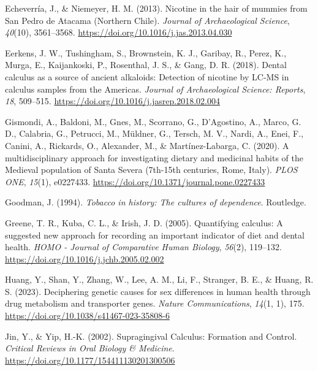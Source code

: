 \documentclass[
  11pt,
  leqno]{scrartcl}
\newlength{\cslhangindent}
\newenvironment{CSLReferences}[2] %
 {\begin{list}{}{%
  \setlength{\itemindent}{0pt}
  \setlength{\leftmargin}{0pt}
  \setlength{\parsep}{0pt}
  \ifodd #1
   \setlength{\leftmargin}{\cslhangindent}
   \setlength{\itemindent}{-1\cslhangindent}
  \fi
  \setlength{\itemsep}{#2\baselineskip}}}
 {\end{list}}
\begin{document}
\begin{CSLReferences}{1}{0}
Echeverría, J., \& Niemeyer, H. M. (2013). Nicotine in the hair of
mummies from {San Pedro} de {Atacama} ({Northern Chile}). \emph{Journal
of Archaeological Science}, \emph{40}(10), 3561--3568.
\url{https://doi.org/10.1016/j.jas.2013.04.030}

Eerkens, J. W., Tushingham, S., Brownstein, K. J., Garibay, R., Perez,
K., Murga, E., Kaijankoski, P., Rosenthal, J. S., \& Gang, D. R. (2018).
Dental calculus as a source of ancient alkaloids: {Detection} of
nicotine by {LC-MS} in calculus samples from the {Americas}.
\emph{Journal of Archaeological Science: Reports}, \emph{18}, 509--515.
\url{https://doi.org/10.1016/j.jasrep.2018.02.004}

Gismondi, A., Baldoni, M., Gnes, M., Scorrano, G., D'Agostino, A.,
Marco, G. D., Calabria, G., Petrucci, M., Müldner, G., Tersch, M. V.,
Nardi, A., Enei, F., Canini, A., Rickards, O., Alexander, M., \&
Martínez-Labarga, C. (2020). A multidisciplinary approach for
investigating dietary and medicinal habits of the {Medieval} population
of {Santa Severa} (7th-15th centuries, {Rome}, {Italy}). \emph{PLOS
ONE}, \emph{15}(1), e0227433.
\url{https://doi.org/10.1371/journal.pone.0227433}

Goodman, J. (1994). \emph{Tobacco in history: The cultures of
dependence}. {Routledge}.

Greene, T. R., Kuba, C. L., \& Irish, J. D. (2005). Quantifying
calculus: {A} suggested new approach for recording an important
indicator of diet and dental health. \emph{HOMO - Journal of Comparative
Human Biology}, \emph{56}(2), 119--132.
\url{https://doi.org/10.1016/j.jchb.2005.02.002}

Huang, Y., Shan, Y., Zhang, W., Lee, A. M., Li, F., Stranger, B. E., \&
Huang, R. S. (2023). Deciphering genetic causes for sex differences in
human health through drug metabolism and transporter genes. \emph{Nature
Communications}, \emph{14}(1, 1), 175.
\url{https://doi.org/10.1038/s41467-023-35808-6}

Jin, Y., \& Yip, H.-K. (2002). Supragingival {Calculus}: {Formation} and
{Control}. \emph{Critical Reviews in Oral Biology \& Medicine}.
\url{https://doi.org/10.1177/154411130201300506}


\end{CSLReferences}
\end{document}
